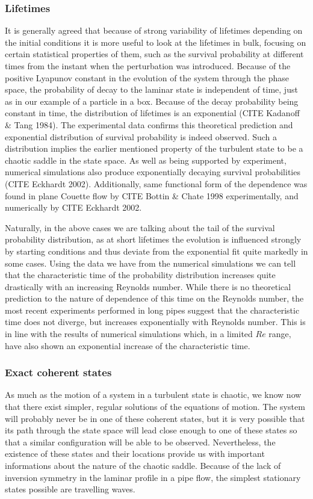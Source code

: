 \documentclass[11pt,a4paper]{article}
\begin{document}
\subsubsection{Lifetimes}
It is generally agreed that because of strong variability of lifetimes depending on the initial conditions it is more useful to look at the lifetimes in bulk, focusing on certain statistical properties of them, such as the survival probability at different times from the instant when the perturbation was introduced.
Because of the positive Lyapunov constant in the evolution of the system through the phase space, the probability of decay to the laminar state is independent of time, just as in our example of a particle in a box.
Because of the decay probability being constant in time, the distribution of lifetimes is an exponential (CITE Kadanoff \& Tang 1984).
The experimental data confirms this theoretical prediction and exponential distribution of survival probability is indeed observed.
Such a distribution implies the earlier mentioned property of the turbulent state to be a chaotic saddle in the state space.
As well as being supported by experiment, numerical simulations also produce exponentially decaying survival probabilities (CITE Eckhardt 2002).
Additionally, same functional form of the dependence was found in plane Couette flow by CITE Bottin \& Chate 1998 experimentally, and numerically by CITE Eckhardt 2002.

Naturally, in the above cases we are talking about the tail of the survival probability distribution, as at short lifetimes the evolution is influenced strongly by starting conditions and thus deviate from the exponential fit quite markedly in some cases.
Using the data we have from the numerical simulations we can tell that the characteristic time of the probability distribution increases quite drastically with an increasing Reynolds number.
While there is no theoretical prediction to the nature of dependence of this time on the Reynolds number, the most recent experiments performed in long pipes suggest that the characteristic time does not diverge, but increases exponentially with Reynolds number.
This is in line with the results of numerical simulations which, in a limited \(Re\) range, have also shown an exponential increase of the characteristic time.

\subsubsection{Exact coherent states}
As much as the motion of a system in a turbulent state is chaotic, we know now that there exist simpler, regular solutions of the equations of motion.
The system will probably never be in one of these coherent states, but it is very possible that its path through the state space will lead close enough to one of these states so that a similar configuration will be able to be observed.
Nevertheless, the existence of these states and their locations provide us with important informations about the nature of the chaotic saddle.
Because of the lack of inversion symmetry in the laminar profile in a pipe flow, the simplest stationary states possible are travelling waves.




\end{document}
